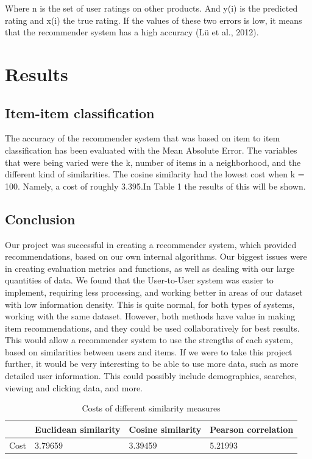 \documentclass[11pt]{article}
\begin{document}
Where n is the set of user ratings on other products. And y(i) is the predicted rating and x(i)  the true rating. 
If the values of these two errors is low, it means that the recommender system has a high accuracy (Lü et al., 2012). 

\section{Results}
\subsection{Item-item classification}
The accuracy of the recommender system that was based on item to item classification has been evaluated with the Mean Absolute Error. The variables that were being varied were the k, number of items in a neighborhood, and the different kind of similarities. The cosine similarity had the lowest cost when k = 100. Namely, a cost of roughly 3.395.In Table 1 the results of this will be shown.\\

\subsection{Conclusion}
Our project was successful in creating a recommender system, which provided recommendations, based on our own internal algorithms. Our biggest issues were in creating evaluation metrics and functions, as well as dealing with our large quantities of data. We found that the User-to-User system was easier to implement, requiring less processing, and working better in areas of our dataset with low information density. This is quite normal, for both types of systems, working with the same dataset. However, both methods have value in making item recommendations, and they could be used collaboratively for best results. This would allow a recommender system to use the strengths of each system, based on similarities between users and items. If we were to take this project further, it would be very interesting to be able to use more data, such as more detailed user information. This could possibly include demographics, searches, viewing and clicking data, and more.
 
\newpage

\begin{table}[]
\begin{tabular}{@{}|l|l|l|l|@{}}
\toprule
     & Euclidean similarity & Cosine similarity & Pearson correlation \\ \midrule
Cost & 3.79659              & 3.39459           & 5.21993             \\ \bottomrule
\end{tabular}
\caption{Costs of different similarity measures}
\end{table}
\end{document}

